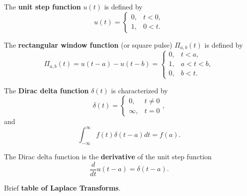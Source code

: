 \documentclass[11pt]{article}
\begin{document}
\begin{preamble}
\begin{formulaitem}

\item The \textbf{unit step function} $u(t)$ is defined by
\begin{equation*}
u(t)=\left\{\begin{array}{ll}
             0, & t<0, \\
             1, & 0<t.
            \end{array} \right. 
\end{equation*}


\item The \textbf{rectangular window function} (or square pulse) $\Pi_{a,b}(t)$ is defined by
\begin{equation*}
\Pi_{a,b}(t)= u(t-a) - u(t-b) = \left\{\begin{array}{ll}
             0, & t<a, \\
             1, & a<t<b, \\
             0, & b<t.
            \end{array} \right. 
\end{equation*}

\item The \textbf{Dirac delta function} $\delta(t)$ is characterized by
\begin{equation*}
\delta(t) = \begin{cases}
0 , & t \neq 0 \\
\infty, & t = 0 
\end{cases},
\end{equation*}
and
\begin{equation*}
\int_{-\infty}^{\infty} f(t) \delta(t-a) d t = f(a).
\end{equation*}

\item The Dirac delta function is the \textbf{derivative} of the unit step function 
\begin{equation*}
\dfrac{ d}{ d t} u(t-a) = \delta(t-a).
\end{equation*}

\item Brief \textbf{table of Laplace Transforms}.


\end{formulaitem}
\end{preamble}
\end{document}
